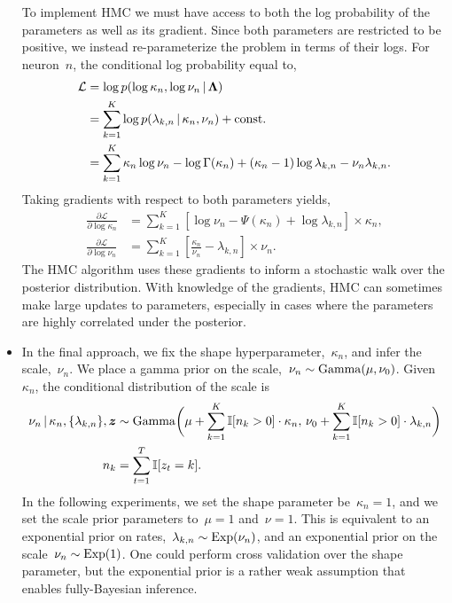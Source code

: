 \begin{itemize}
To implement HMC we must have access to both the log probability of
the parameters as well as its gradient. Since both parameters are
restricted to be positive, we instead re-parameterize the problem in
terms of their logs. For neuron~$n$, the conditional log probability
equal to,
\begin{align*}
\mathcal{L} 
  &= \log p(\log \kappa_n, \log \nu_n \,|\, \boldsymbol{\Lambda}) \\
  &= \sum_{k=1}^K \log p(\lambda_{k,n} \,|\, \kappa_n, \nu_n) + \text{const.} \\
  &= \sum_{k=1}^K \kappa_n \log \nu_n - \log \Gamma(\kappa_n) + (\kappa_n - 1) \log \lambda_{k,n} - \nu_n \lambda_{k,n}.
\end{align*}
Taking gradients with respect to both parameters yields,
\begin{align*}
  \frac{\partial \mathcal{L}}{\partial \log \kappa_n} 
  &= \sum_{k=1}^K \left[ \log \nu_n -\Psi(\kappa_n) + \log \lambda_{k,n} \right] \times \kappa_n, \\
  \frac{\partial \mathcal{L}}{\partial \log \nu_n} 
  &= \sum_{k=1}^K \left[ \frac{\kappa_n}{\nu_n}  - \lambda_{k,n} \right] \times \nu_n.
\end{align*}
The HMC algorithm uses these gradients to inform a stochastic walk
over the posterior distribution. With knowledge of the gradients, HMC
can sometimes make large updates to parameters, especially in cases
where the parameters are highly correlated under the posterior.


\item In the final approach, we fix the shape
  hyperparameter,~$\kappa_n$, and infer the scale,~$\nu_n$.  We
  place a gamma prior on the scale,~$\nu_n \sim \mathrm{Gamma}(\mu,
  \nu_0)$. Given~$\kappa_n$, the conditional distribution of the scale
  is
\begin{align*}
  \nu_n \,|\, \kappa_n, \{\lambda_{k,n}\}, \boldsymbol{z}  
  &\sim \mathrm{Gamma}\bigg(
    \mu + \sum_{k=1}^K \mathbb{I}[n_k > 0] \cdot \kappa_n, \,
    \nu_0 + \sum_{k=1}^K \mathbb{I}[n_k > 0] \cdot \lambda_{k,n} \bigg) \\
  n_k &= \sum_{t=1}^T \mathbb{I}[z_t=k].
\end{align*}
In the following experiments, we set the shape parameter
be~$\kappa_n=1$, and we set the scale prior parameters to~$\mu=1$
and~$\nu=1$.  This is equivalent to an exponential prior on
rates,~$\lambda_{k,n} \sim \mathrm{Exp}(\nu_n)$, and an
exponential prior on the scale~$\nu_n \sim \mathrm{Exp}(1)$.
One could perform cross validation over the shape parameter, but the
exponential prior is a rather weak assumption that enables
fully-Bayesian inference.


\end{itemize}


